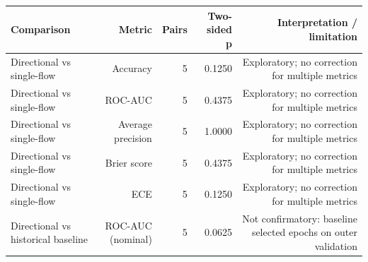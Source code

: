 \begin{tabular}{lrrrr}
\toprule
Comparison & Metric & Pairs & Two-sided p & Interpretation / limitation \\
\midrule
Directional vs single-flow & Accuracy & 5 & 0.1250 & Exploratory; no correction for multiple metrics \\
Directional vs single-flow & ROC-AUC & 5 & 0.4375 & Exploratory; no correction for multiple metrics \\
Directional vs single-flow & Average precision & 5 & 1.0000 & Exploratory; no correction for multiple metrics \\
Directional vs single-flow & Brier score & 5 & 0.4375 & Exploratory; no correction for multiple metrics \\
Directional vs single-flow & ECE & 5 & 0.1250 & Exploratory; no correction for multiple metrics \\
Directional vs historical baseline & ROC-AUC (nominal) & 5 & 0.0625 & Not confirmatory: baseline selected epochs on outer validation \\
\bottomrule
\end{tabular}
